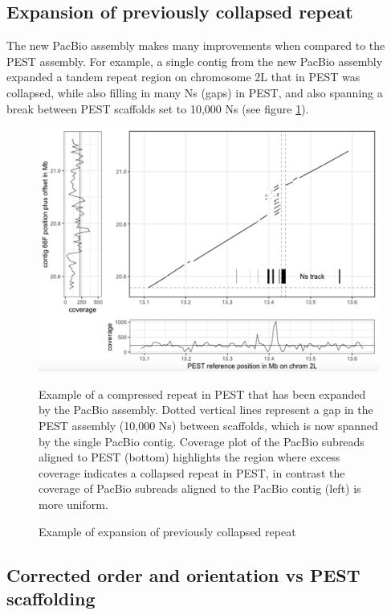 \subsection{Expansion of previously collapsed repeat}

\par{
The new PacBio assembly makes many improvements when compared to the PEST assembly. For example, a single contig from the new PacBio assembly expanded a tandem repeat region on chromosome 2L that in PEST was collapsed, while also filling in many Ns (gaps) in PEST, and also spanning a break between PEST scaffolds set to 10,000 Ns (see figure \ref{figure:repeat}).
}

\begin{figure}[htbp!]

\caption{Example of expansion of previously collapsed repeat}
\label{figure:repeat}
\begin{centering}
\includegraphics[width=1.0\textwidth]{repeatexpansion.png}
\par{ Example of a compressed repeat in PEST that has been expanded by the PacBio assembly. Dotted vertical lines represent a gap in the PEST assembly (10,000 Ns) between scaffolds, which is now spanned by the single PacBio contig. Coverage plot of the PacBio subreads aligned to PEST (bottom) highlights the region where excess coverage indicates a collapsed repeat in PEST, in contrast the coverage of PacBio subreads aligned to the PacBio contig (left) is more uniform. }
\end{centering}
\end{figure}

\subsection{Corrected order and orientation vs PEST scaffolding}

